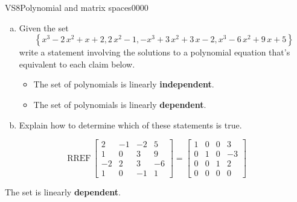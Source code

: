 \newpage




\begin{exercise}{VS8}{Polynomial and matrix spaces}{0000} 
\begin{exerciseStatement} 

\begin{enumerate}[(a)]
\item  

 Given the set \[\left\{ x^{3} - 2 \, x^{2} + x + 2 , 2 \, x^{2} - 1 , -x^{3} + 3 \, x^{2} + 3 \, x - 2 , x^{3} - 6 \, x^{2} + 9 \, x + 5 \right\}\] write a statement involving the solutions to a polynomial equation that's equivalent to each claim below. 

 

\begin{itemize}
\item  

 The set of polynomials is linearly \textbf{independent}. 

 
\item  

 The set of polynomials is linearly \textbf{dependent}. 

 
\end{itemize}

     
\item  

 Explain how to determine which of these statements is true. 

 
\end{enumerate}

     \end{exerciseStatement}
 \begin{exerciseAnswer} 

 \[
\mathrm{RREF}\, \left[\begin{array}{cccc}
2 & -1 & -2 & 5 \\
1 & 0 & 3 & 9 \\
-2 & 2 & 3 & -6 \\
1 & 0 & -1 & 1
\end{array}\right] = \left[\begin{array}{cccc}
1 & 0 & 0 & 3 \\
0 & 1 & 0 & -3 \\
0 & 0 & 1 & 2 \\
0 & 0 & 0 & 0
\end{array}\right]
            \] 

 

 The set is linearly \textbf{dependent}. 

 \end{exerciseAnswer}
 \end{exercise}



